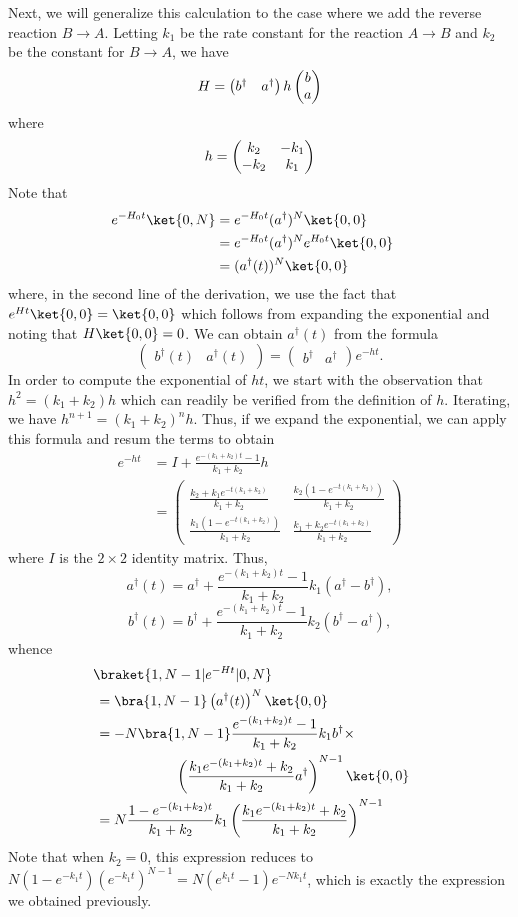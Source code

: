 Next, we will generalize this calculation to the case where we add the reverse reaction $B \to A$.  Letting $k_1$ be the rate constant for the reaction $A \to B$ and $k_2$ be the constant for $B \to A$, we have
\[
 H = \begin{pmatrix} b^\dagger & a^\dagger \end{pmatrix} h \begin{pmatrix} b \cr a \end{pmatrix}
\]
where
\[
 h = \begin{pmatrix} k_2 & -k_1 \cr -k_2 & k_1 \end{pmatrix}
\]
Note that
\begin{align*}
 e^{-H_0 t} \ket{0, N} &=
 e^{-H_0 t} (a^\dagger)^N \ket{0, 0} \cr &=
 e^{-H_0 t} (a^\dagger)^N e^{H_0 t} \ket{0, 0} \cr &=
 (a^\dagger (t))^N \ket{0, 0}
\end{align*}
where, in the second line of the derivation, we use the fact that $e^{Ht} \ket{0, 0} = \ket{0, 0}$ which follows from expanding the exponential and noting that $H \ket{0, 0} = 0$.  We can obtain $a^\dagger (t)$ from the formula
\[
 \begin{pmatrix} b^\dagger(t) & a^\dagger(t) \end{pmatrix} =
 \begin{pmatrix} b^\dagger & a^\dagger \end{pmatrix} e^{-ht} .
\]
In order to compute the exponential of $ht$, we start with the observation that $h^2 = (k_1 + k_2) h$ which can readily be verified from the definition of $h$.  Iterating, we have $h^{n+1} = (k_1 + k_2)^n h$.  Thus, if we expand the exponential, we can apply this formula and resum the terms to obtain
\begin{align*}
 e^{-ht} &= I + \frac{e^{-(k_1 + k_2) t} - 1}{k_1 + k_2} h \\ &=
 \begin{pmatrix} \frac{k_2 + k_1 e^{-t(k_1 + k_2)}}{k_1 + k_2} &
   \frac{k_2 (1 - e^{-t(k_1 + k_2)})}{k_1 + k_2} \\
 \frac{k_1 (1 - e^{-t(k_1 + k_2)})}{k_1 + k_2} &
    \frac{k_1 + k_2 e^{-t(k_1 + k_2)}}{k_1 + k_2}
 \end{pmatrix}
\end{align*}
where $I$ is the $2 \times 2$ identity matrix.  Thus,
\[
 a^\dagger (t) = a^\dagger +
 \frac{e^{-(k_1 + k_2) t} - 1}{k_1 + k_2} k_1 (a^\dagger - b^\dagger) ,
\]
\[
 b^\dagger (t) = b^\dagger +
 \frac{e^{-(k_1 + k_2) t} - 1}{k_1 + k_2} k_2 (b^\dagger - a^\dagger) ,
\]
whence
\begin{align*}
 &\!\braket{1, N-1 | e^{-Ht} | 0, N} \cr &=
 \bra{1, N-1} \left( a^\dagger (t) \right)^N \ket{0, 0} \cr &=
 -N \bra{1, N-1} \frac{e^{-(k_1 + k_2) t} - 1}{k_1 + k_2} k_1 b^\dagger \times \cr
   &\hskip2cm \left( \frac{k_1 e^{-(k_1 + k_2) t} + k_2}{k_1 + k_2} a^\dagger \right)^{N-1} \ket{0, 0} \cr &=
 N \frac{1 - e^{-(k_1 + k_2) t}}{k_1 + k_2} k_1 \left( \frac{k_1 e^{-(k_1 + k_2) t} + k_2}{k_1 + k_2} \right)^{N-1}
\end{align*}
Note that when $k_2 = 0$, this expression reduces to $N(1-e^{-k_1 t})(e^{-k_1 t})^{N-1} =N (e^{k_1 t} - 1) e^{-N k_1 t}$, which is exactly the expression we obtained previously.

